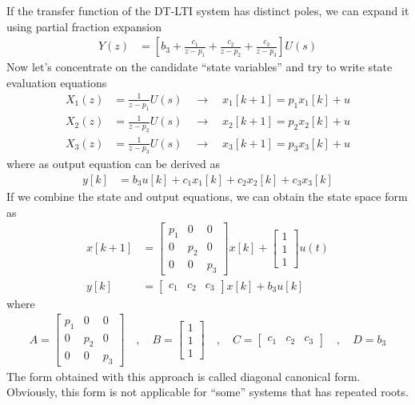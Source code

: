 \documentclass[twoside]{article}
\begin{document}
If the transfer function of the DT-LTI system 
has distinct poles, we can expand it 
using partial fraction expansion 
%
\begin{align*}
Y(z) &= \left[ b_3 + \frac{c_1}{z - p_1} + \frac{c_2}{z - p_2} 
+ \frac{c_3}{z - p_3} \right] U(s)
\end{align*}
%
Now let's concentrate on the candidate ``state variables''
and try to write state evaluation equations
%
\begin{align*}
X_1(z) &= \frac{1}{z - p_1} U(s) \quad \rightarrow \quad x_1[k+1] = p_1 x_1[k] + u
\\
X_2(z) &= \frac{1}{z - p_2} U(s) \quad \rightarrow \quad x_2[k+1] =
         p_2 x_2[k] + u
\\
X_3(z) &= \frac{1}{z - p_3} U(s) \quad \rightarrow \quad x_3[k+1] = p_3 x_3[k] + u
\end{align*}
%
where as output equation can be derived as
%
\begin{align*}
y[k] &= b_3 u[k] + c_1 x_1[k] + c_2 x_2[k] + c_3 x_3[k]
\end{align*}
%
If we combine the state and output equations, we
can obtain the state space form as
%
\begin{align*}
  x[k+1] &= \left[ \begin{array}{ccc} p_1 & 0 & 0\\ 0 & p_2 & 0
    \\ 0 & 0 & p_3 \end{array} \right] x[k]
   + 
  \left[ \begin{array}{c} 1 \\ 1
    \\ 1 \end{array} \right] u(t)
\\
y[k] &= \left[ \begin{array}{ccc} c_1 & c_2 & c_3 \end{array} \right] x[k]
+ b_3 u[k]
\end{align*}
%
where 
%
\begin{align*}
A = \left[ \begin{array}{ccc} p_1 & 0 & 0 \\ 0 & p_2 & 0
    \\ 0 & 0 & p_3 \end{array} \right]
\quad , \quad 
B = \left[ \begin{array}{c} 1 \\ 1
    \\ 1 \end{array} \right]
\quad , \quad
C = \left[ \begin{array}{ccc} c_1 & c_2 & c_3 \end{array} \right]
\quad , \quad
D = b_3
\end{align*}
%
The form obtained with this approach is called
diagonal canonical form. Obviously, this form is
not applicable for ``some'' systems that has repeated roots.
\end{document}
